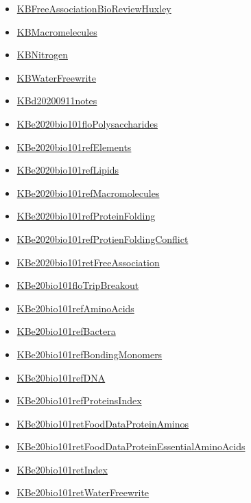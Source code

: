 \documentclass[11pt]{article}
\begin{document}
\begin{itemize}
\begin{itemize}
\item \href{bio101/KBFreeAssociationBioReviewHuxley.org}{KBFreeAssociationBioReviewHuxley}
\item \href{bio101/KBMacromelecules.org}{KBMacromelecules}
\item \href{bio101/KBNitrogen.org}{KBNitrogen}
\item \href{bio101/KBWaterFreewrite.org}{KBWaterFreewrite}
\item \href{bio101/KBd20200911notes.org}{KBd20200911notes}
\item \href{bio101/KBe2020bio101floPolysaccharides.org}{KBe2020bio101floPolysaccharides}
\item \href{bio101/KBe2020bio101refElements.org}{KBe2020bio101refElements}
\item \href{bio101/KBe2020bio101refLipids.org}{KBe2020bio101refLipids}
\item \href{bio101/KBe2020bio101refMacromolecules.org}{KBe2020bio101refMacromolecules}
\item \href{bio101/KBe2020bio101refProteinFolding.org}{KBe2020bio101refProteinFolding}
\item \href{bio101/KBe2020bio101refProtienFoldingConflict.org}{KBe2020bio101refProtienFoldingConflict}
\item \href{bio101/KBe2020bio101retFreeAssociation.org}{KBe2020bio101retFreeAssociation}
\item \href{bio101/KBe20bio101floTripBreakout.org}{KBe20bio101floTripBreakout}
\item \href{bio101/KBe20bio101refAminoAcids.org}{KBe20bio101refAminoAcids}
\item \href{bio101/KBe20bio101refBactera.org}{KBe20bio101refBactera}
\item \href{bio101/KBe20bio101refBondingMonomers.org}{KBe20bio101refBondingMonomers}
\item \href{bio101/KBe20bio101refDNA.org}{KBe20bio101refDNA}
\item \href{bio101/KBe20bio101refProteinsIndex.org}{KBe20bio101refProteinsIndex}
\item \href{bio101/KBe20bio101retFoodDataProteinAminos.org}{KBe20bio101retFoodDataProteinAminos}
\item \href{bio101/KBe20bio101retFoodDataProteinEssentialAminoAcids.org}{KBe20bio101retFoodDataProteinEssentialAminoAcids}
\item \href{bio101/KBe20bio101retIndex.org}{KBe20bio101retIndex}
\item \href{bio101/KBe20bio101retWaterFreewrite.org}{KBe20bio101retWaterFreewrite}

\end{itemize}
\end{itemize}
\end{document}
